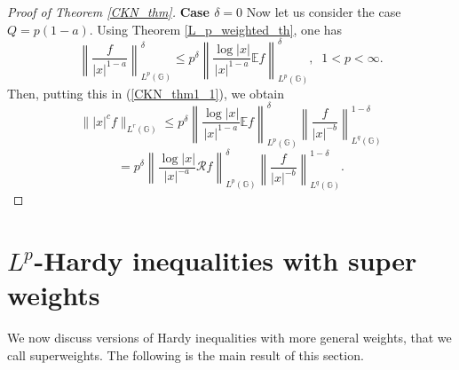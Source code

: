 \documentclass[a4paper,12pt,reqno]{amsart}
\renewcommand\eqref[1]{(\ref{#1})} %
\numberwithin{equation}{section}
\theoremstyle{plain}
\theoremstyle{definition}
\begin{document}
\begin{proof}[Proof of Theorem \ref{CKN_thm}] {\bf Case $\delta=0$}
Now let us consider the case $Q=p(1-a)$. Using Theorem \ref{L_p_weighted_th}, one has
$$\left\|\frac{f}{|x|^{1-a}}\right\|^{\delta}_{L^{p}(\mathbb{G})}\leq
p^{\delta} \left\|\frac{\log|x|}{|x|^{1-a}}\mathbb{E}f\right\|^{\delta}_{L^{p}(\mathbb{G})}, \;\;1<p<\infty.$$
Then, putting this in \eqref{CKN_thm1_1}, we obtain
$$\||x|^{c}f\|_{L^{r}(\mathbb{G})}\leq
p^{\delta} \left\|\frac{\log|x|}{|x|^{1-a}}\mathbb{E}f\right\|^{\delta}_{L^{p}(\mathbb{G})}
\left\|\frac{f}{|x|^{-b}}\right\|^{1-\delta}_{L^{q}(\mathbb{G})}
$$
$$=p^{\delta} \left\|\frac{\log|x|}{|x|^{-a}}\mathcal{R}f\right\|^{\delta}_{L^{p}(\mathbb{G})}
\left\|\frac{f}{|x|^{-b}}\right\|^{1-\delta}_{L^{q}(\mathbb{G})}.$$
\end{proof}

\section{$L^{p}$-Hardy inequalities with super weights}
\label{SEC:2}

We now discuss versions of Hardy inequalities with more general weights, that we call superweights.
The following is the main result of this section.
\end{document}
